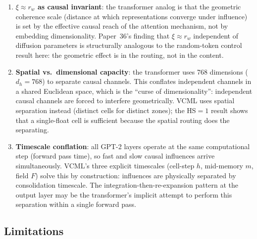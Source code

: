 \documentclass[11pt,a4paper]{article}
\begin{document}
\begin{enumerate}
\item \textbf{$\xi \approx r_w$ as causal invariant}: the transformer analog is that
  the geometric coherence scale (distance at which representations converge under
  influence) is set by the effective causal reach of the attention mechanism,
  not by embedding dimensionality.
  Paper~36's finding that $\xi \approx r_w$ independent of diffusion parameters
  is structurally analogous to the random-token control result here:
  the geometric effect is in the routing, not in the content.

\item \textbf{Spatial vs.\ dimensional capacity}: the transformer uses 768 dimensions
  ($d_h = 768$) to separate causal channels.
  This conflates independent channels in a shared Euclidean space,
  which is the ``curse of dimensionality'': independent causal channels
  are forced to interfere geometrically.
  VCML uses spatial separation instead (distinct cells for distinct zones);
  the HS$=1$ result shows that a single-float cell is sufficient
  because the spatial routing does the separating.

\item \textbf{Timescale conflation}: all GPT-2 layers operate at the same
  computational step (forward pass time), so fast and slow causal influences
  arrive simultaneously.
  VCML's three explicit timescales (cell-step $h$, mid-memory $m$, field $F$)
  solve this by construction: influences are physically separated by consolidation
  timescale.
  The integration-then-re-expansion pattern at the output layer may be the
  transformer's implicit attempt to perform this separation within a single
  forward pass.
\end{enumerate}

\subsection{Limitations}
\end{document}
